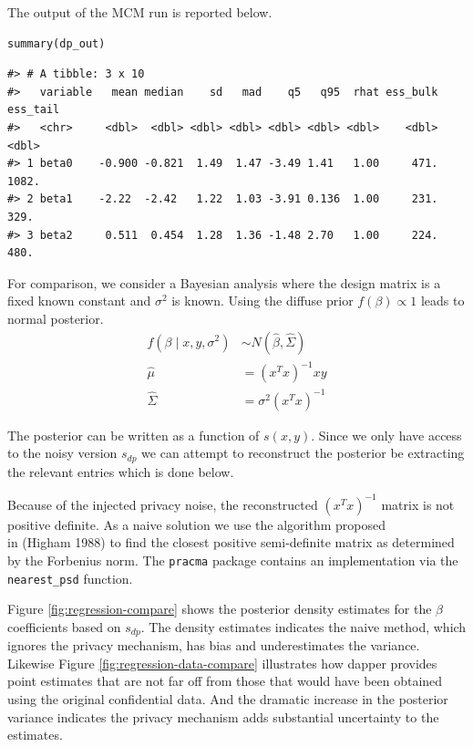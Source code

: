 The output of the MCM run is reported below.

\begin{verbatim}
summary(dp_out)
\end{verbatim}

\begin{verbatim}
#> # A tibble: 3 x 10
#>   variable   mean median    sd   mad    q5   q95  rhat ess_bulk ess_tail
#>   <chr>     <dbl>  <dbl> <dbl> <dbl> <dbl> <dbl> <dbl>    <dbl>    <dbl>
#> 1 beta0    -0.900 -0.821  1.49  1.47 -3.49 1.41   1.00     471.    1082.
#> 2 beta1    -2.22  -2.42   1.22  1.03 -3.91 0.136  1.00     231.     329.
#> 3 beta2     0.511  0.454  1.28  1.36 -1.48 2.70   1.00     224.     480.
\end{verbatim}

For comparison, we consider a Bayesian analysis where the design matrix
is a fixed known constant and \(\sigma^2\) is known. Using the
diffuse prior \(f(\beta) \propto 1\) leads to normal posterior.
\[
\begin{aligned}
f(\beta \mid x,y, \sigma^2) &\sim N(\hat{\beta}, \hat{\Sigma})\\
\hat{\mu} &= (x^Tx)^{-1}xy\\
\hat{\Sigma} &= \sigma^{2}(x^Tx)^{-1}
\end{aligned}
\]

The posterior can be written as a function of \(s(x,y)\). Since
we only have access to the noisy version \(s_{dp}\) we can
attempt to reconstruct the posterior be extracting the
relevant entries which is done below.

Because of the injected privacy noise, the reconstructed
\((x^Tx)^{-1}\) matrix is not positive definite. As
a naive solution we use the algorithm proposed\\
in (Higham 1988) to find the closest positive semi-definite matrix
as determined by the Forbenius norm. The \texttt{pracma}
package contains an implementation via the \texttt{nearest\_psd}
function.

Figure \ref{fig:regression-compare} shows the posterior density estimates for the \(\beta\) coefficients based
on \(s_{dp}\). The density estimates indicates the naive method, which ignores the privacy mechanism, has bias and
underestimates the variance. Likewise Figure \ref{fig:regression-data-compare}
illustrates how dapper provides point estimates that are not far off from those
that would have been obtained using the original confidential data. And the dramatic
increase in the posterior variance indicates the privacy mechanism adds substantial
uncertainty to the estimates.

